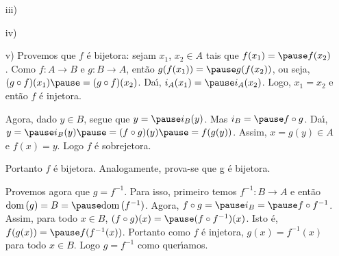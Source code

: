 \documentclass{beamer}
\begin{document}
    \begin{frame}
        \begin{enumerate}
            \item[iii)]\phantom{nada}\\

            \vspace{3.5cm}

            \item[iv)]
        \end{enumerate}
        \vspace{3.5cm}
    \end{frame}

    \begin{frame}
        \begin{enumerate}
            \item[v)] Provemos que $f$ \'e bijetora: \pause sejam $x_1$, \pause $x_2 \in A$ \pause tais que $f(x_1) = \pause f(x_2)$. \pause Como $f : A \to B$ \pause e $g : B \to A$, \pause ent{\~a}o $g(f(x_1)) = \pause g(f(x_2))$, \pause ou seja, \pause $(g\circ f)(x_1) \pause = (g\circ f)(x_2)$. \pause Da{\'\i}, $i_{A}(x_1) = \pause i_{A}(x_2)$. \pause Logo, \pause $x_1 = x_2$ \pause \linebreak e ent\~ao $f$ {\'e} injetora.\pause

            \vspace{.3cm}

            Agora, dado $y \in B$, \pause segue que $y = \pause i_{B}(y)$. \pause Mas $i_{B} = \pause f\circ g$. \pause Da{\'\i}, \pause $y = \pause i_{B}(y) \pause = (f\circ g)(y) \pause = f(g(y))$. \pause Assim, \pause $x = g(y) \in A$ \pause e $f(x) = y$. \pause Logo $f$ {\'e} sobrejetora.\pause

            \vspace{.3cm}

            Portanto $f$ {\'e} bijetora. \pause Analogamente, prova-se que g {\'e} bijetora.\pause

            \vspace{.3cm}

            Provemos agora que \pause $g = f^{-1}$. \pause Para isso, \pause primeiro temos \linebreak $f^{-1} : B \to A$ \pause e ent\~ao $\dom(g) = B = \pause \dom(f^{-1})$. \pause Agora, $f\circ g = \pause i_{B} = \pause f\circ f^{-1}$. \pause Assim, para todo $x \in B$, \pause $(f\circ g)(x) = \pause (f\circ f^{-1})(x)$. \pause Isto {\'e}, \pause $f(g(x)) = \pause f(f^{-1}(x))$. \pause Portanto como $f$ \'e injetora, \pause $g(x) = f^{-1}(x)$ \pause para todo $x \in B$. \pause Logo $g = f^{-1}$ \pause como quer{\'\i}amos.\pause \hspace{.5cm} \qedsymbol
        \end{enumerate}
    \end{frame}
\end{document}
